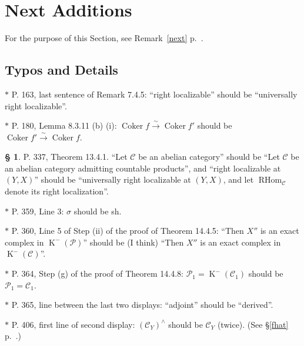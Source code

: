 \documentclass[12pt]{article}
\theoremstyle{remark}
\theoremstyle{definition}
\newtheorem{s}[thm]{\S}
\newcommand{\nn}{\noindent}
\newcommand{\cc}{\mathcal}
\newcommand{\mc}{\mathcal}
\newcommand{\oo}{\operatorname}
\newcommand{\A}{\mathcal A}
\newcommand{\C}{\mathcal C}
\newcommand{\xr}{\xrightarrow}
\DeclareMathOperator{\Coker}{Coker}
\begin{document}
\section{Next Additions}
%
For the purpose of this Section, see Remark~\ref{next} p.~\pageref{next}.
%
\subsection{Typos and Details}
%
$*$ P. 163, last sentence of Remark 7.4.5: ``right localizable'' should be ``universally right localizable''.

\noindent $*$ P. 180, Lemma 8.3.11 (b) (i): $\Coker f\xr\sim\Coker f'$ should be $\Coker f'\xr\sim\Coker f$.

\begin{s}\label{1341}
P. 337, Theorem 13.4.1. ``Let $\C$ be an abelian category'' should be ``Let $\C$ be an abelian category admitting countable products'', and ``right localizable at $(Y,X)$'' should be ``universally right localizable at $(Y,X)$, and let $\oo{RHom}_\C$ denote its right localization''.
\end{s}

\noindent $*$ P. 359, Line 3: $\sigma$ should be sh.


\noindent $*$ P. 360, Line 5 of Step (ii) of the proof of Theorem 14.4.5: ``Then $X''$ is an exact complex in $\oo K^-(\cc P)$'' should be (I think) ``Then $X''$ is an exact complex in $\oo K^-(\cc C)$''.


\noindent $*$ P. 364, Step (g) of the proof of Theorem 14.4.8: $\mc P_1=\oo K^-(\C_1)$ should be $\mc P_1=\C_1$.

\noindent $*$ P. 365, line between the last two displays: ``adjoint'' should be ``derived''.

\nn $*$ P. 406, first line of second display: $(\C_Y)^\wedge$ should be $\C_Y$ (twice). (See \S\ref{fhat} p.~\pageref{fhat}.)

\end{document}
